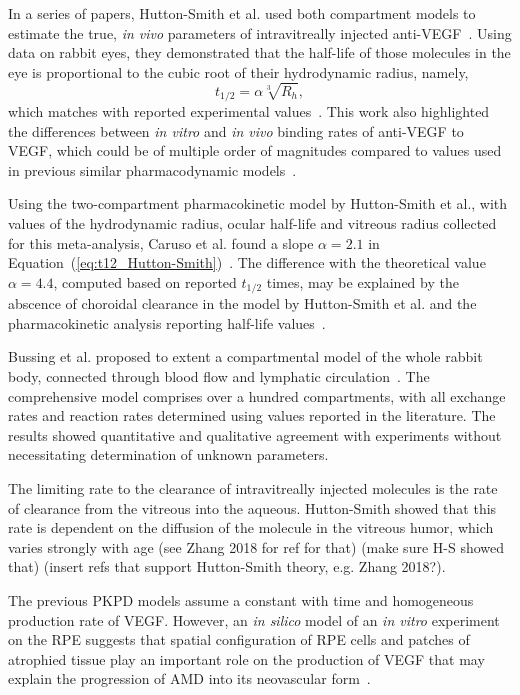 \documentclass[11pt,a4paper, twocolumn]{article}
\begin{document}
In a series of papers, Hutton-Smith et al. used both compartment models to estimate the true, \textit{in vivo} parameters of intravitreally injected anti-VEGF~\cite{hutton-smith_mechanistic_2016,hutton-smith_ocular_2017,hutton-smith_theoretical_2018}.
Using data on rabbit eyes, they demonstrated that the half-life of those molecules in the eye is proportional to the cubic root of their hydrodynamic radius, namely,
\begin{equation}
  \label{eq:t12_Hutton-Smith}
  t_{1/2} = \alpha\sqrt[3]{R_h},
\end{equation}
which matches with reported experimental values~\cite{hutton-smith_mechanistic_2016}.
This work also highlighted the differences between \textit{in vitro} and \textit{in vivo} binding rates of anti-VEGF to VEGF, which could be of multiple order of magnitudes compared to values used in previous similar pharmacodynamic models~\cite{saunders_model_2015}.

Using the two-compartment pharmacokinetic model by Hutton-Smith et al., with values of the hydrodynamic radius, ocular half-life and vitreous radius collected for this meta-analysis, Caruso et al. found a slope $\alpha=2.1$ in Equation~(\ref{eq:t12_Hutton-Smith})~\cite{Caruso_2020}.
The difference with the theoretical value $\alpha=4.4$, computed based on reported $t_{1/2}$ times, may be explained by the abscence of choroidal clearance in the model by Hutton-Smith et al. and the pharmacokinetic analysis reporting half-life values~\cite{hutton-smith_mechanistic_2016}.

Bussing et al. proposed to extent a compartmental model of the whole rabbit body, connected through blood flow and lymphatic circulation~\cite{Bussing_2020}.
The comprehensive model comprises over a hundred compartments, with all exchange rates and reaction rates determined using values reported in the literature.
The results showed quantitative and qualitative agreement with experiments without necessitating determination of unknown parameters. 

The limiting rate to the clearance of intravitreally injected molecules is the rate of clearance from the vitreous into the aqueous.
Hutton-Smith showed that this rate is dependent on the diffusion of the molecule in the vitreous humor, which varies strongly with age (see Zhang 2018 for ref for that) (make sure H-S showed that) (insert refs that support Hutton-Smith theory, e.g. Zhang 2018?).

The previous PKPD models assume a constant with time and homogeneous production rate of VEGF.
However, an \textit{in silico} model of an \textit{in vitro} experiment on the RPE suggests that spatial configuration of RPE cells and patches of atrophied tissue play an important role on the production of VEGF that may explain the progression of AMD into its neovascular form~\cite{Baker_2017}.  
\end{document}

